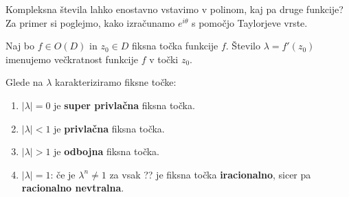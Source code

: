 \documentclass{beamer}
\begin{document}

\begin{frame}
    Kompleksna števila lahko enostavno vstavimo v polinom, kaj pa druge funkcije? 
    Za primer si poglejmo, kako izračunamo $e^{i\theta}$ s pomočjo Taylorjeve vrste.
    
\end{frame}

\begin{frame}

        Naj bo $f \in O(D)$ in $z_0 \in D$ fiksna točka funkcije $f$.
        Število $\lambda = f'(z_0)$ imenujemo večkratnost funkcije $f$ v točki $z_0$.
    

    \begin{exampleblock}{Glede na $\lambda$ karakteriziramo fiksne točke:}
        \begin{enumerate} 
            \item $|\lambda| = 0$ je \textbf{super privlačna} fiksna točka.
            \item $|\lambda| < 1$ je \textbf{privlačna} fiksna točka.
            \item $|\lambda| > 1$ je \textbf{odbojna} fiksna točka.
            \item $|\lambda| = 1$: 
                če je $\lambda^n \neq 1$ za vsak ?? je fiksna točka \textbf{iracionalno},
                sicer pa \textbf{racionalno nevtralna}.
        \end{enumerate}
    \end{exampleblock}
\end{frame}

\begin{frame}

\end{frame}
\end{document}
